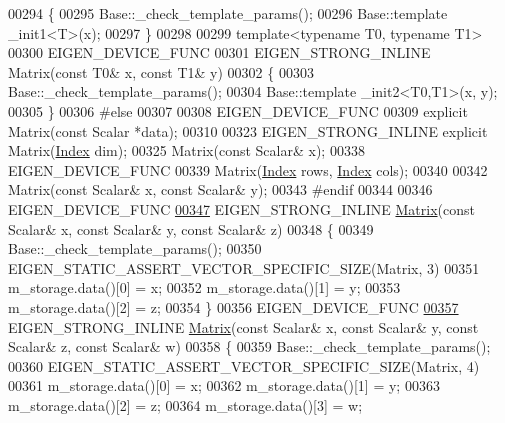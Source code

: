 \begin{DoxyCode}
00294     \{
00295       Base::\_check\_template\_params();
00296       Base::template \_init1<T>(x);
00297     \}
00298 
00299     \textcolor{keyword}{template}<\textcolor{keyword}{typename} T0, \textcolor{keyword}{typename} T1>
00300     EIGEN\_DEVICE\_FUNC
00301     EIGEN\_STRONG\_INLINE Matrix(\textcolor{keyword}{const} T0& x, \textcolor{keyword}{const} T1& y)
00302     \{
00303       Base::\_check\_template\_params();
00304       Base::template \_init2<T0,T1>(x, y);
00305     \}
00306 \textcolor{preprocessor}{    #else}
00307 
00308     EIGEN\_DEVICE\_FUNC
00309     \textcolor{keyword}{explicit} Matrix(\textcolor{keyword}{const} Scalar *data);
00310 
00323     EIGEN\_STRONG\_INLINE \textcolor{keyword}{explicit} Matrix(\hyperlink{namespace_eigen_a62e77e0933482dafde8fe197d9a2cfde}{Index} dim);
00325     Matrix(\textcolor{keyword}{const} Scalar& x);
00338     EIGEN\_DEVICE\_FUNC
00339     Matrix(\hyperlink{namespace_eigen_a62e77e0933482dafde8fe197d9a2cfde}{Index} rows, \hyperlink{namespace_eigen_a62e77e0933482dafde8fe197d9a2cfde}{Index} cols);
00340     
00342     Matrix(\textcolor{keyword}{const} Scalar& x, \textcolor{keyword}{const} Scalar& y);
00343 \textcolor{preprocessor}{    #endif}
00344 
00346     EIGEN\_DEVICE\_FUNC
\hyperlink{group___core___module_a0a422e4c801e859d47226c348c482cb5}{00347}     EIGEN\_STRONG\_INLINE \hyperlink{group___core___module_a0a422e4c801e859d47226c348c482cb5}{Matrix}(\textcolor{keyword}{const} Scalar& x, \textcolor{keyword}{const} Scalar& y, \textcolor{keyword}{const} Scalar& z)
00348     \{
00349       Base::\_check\_template\_params();
00350       EIGEN\_STATIC\_ASSERT\_VECTOR\_SPECIFIC\_SIZE(Matrix, 3)
00351       m\_storage.data()[0] = x;
00352       m\_storage.data()[1] = y;
00353       m\_storage.data()[2] = z;
00354     \}
00356     EIGEN\_DEVICE\_FUNC
\hyperlink{group___core___module_afe8c7913883c78db58f15e22103f93a2}{00357}     EIGEN\_STRONG\_INLINE \hyperlink{group___core___module_afe8c7913883c78db58f15e22103f93a2}{Matrix}(\textcolor{keyword}{const} Scalar& x, \textcolor{keyword}{const} Scalar& y, \textcolor{keyword}{const} Scalar& z, \textcolor{keyword}{const} Scalar& w)
00358     \{
00359       Base::\_check\_template\_params();
00360       EIGEN\_STATIC\_ASSERT\_VECTOR\_SPECIFIC\_SIZE(Matrix, 4)
00361       m\_storage.data()[0] = x;
00362       m\_storage.data()[1] = y;
00363       m\_storage.data()[2] = z;
00364       m\_storage.data()[3] = w;

\end{DoxyCode}

